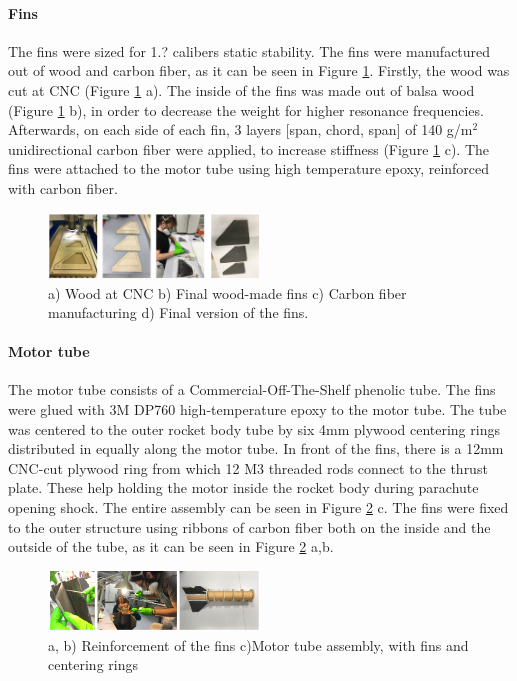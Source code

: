 \paragraph{Fins}
\hfill \break
    The fins were sized for 1.? calibers static stability. %
    The fins were manufactured out of wood and carbon fiber, as it can be seen in Figure \ref{f:fins}. Firstly, the wood was cut at CNC (Figure \ref{f:fins} a). The inside of the fins was made out of balsa wood (Figure \ref{f:fins} b), in order to decrease the weight for higher resonance frequencies. Afterwards, on each side of each fin, 3 layers [span, chord, span] of 140 g/m$^2$ unidirectional carbon fiber were applied, to increase stiffness (Figure \ref{f:fins} c). The fins were attached to the motor tube using high temperature epoxy, reinforced with carbon fiber.
    \begin{figure}[h!]
        \centering
        \includegraphics[width=0.5\textwidth]{img/fins.png}
        \caption{a) Wood at CNC b) Final wood-made fins c) Carbon fiber manufacturing d) Final version of the fins.}
        \label{f:fins}
    \end{figure}


\paragraph{Motor tube}
\hfill \break
The motor tube consists of a Commercial-Off-The-Shelf phenolic tube. The fins were glued with 3M DP760 high-temperature epoxy to the motor tube. The tube was centered to the outer rocket body tube by six 4mm plywood centering rings distributed in equally along the motor tube.
In front of the fins, there is a 12mm CNC-cut plywood ring from which 12 M3 threaded rods connect to the thrust plate. These help holding the motor inside the rocket body during parachute opening shock.
The entire assembly can be seen in Figure \ref{f:reinforcement} c. The fins were fixed to the outer structure using ribbons of carbon fiber both on the inside and the outside of the tube, as it can be seen in Figure \ref{f:reinforcement} a,b.

  \begin{figure}[h!]
\centering
\includegraphics[width=0.5\textwidth]{img/fins_glue.png}
\caption{a, b) Reinforcement of the fins c)Motor tube assembly, with fins and centering rings}
\label{f:reinforcement}
\end{figure}


